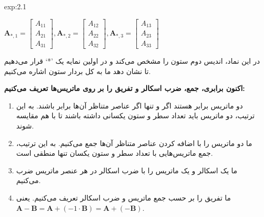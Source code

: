 {\begin{spacing}{1.5}
\begin{example}{exp:2.1}
            \begin{center}
                $\textbf{A}_{*,1}=\begin{bmatrix}
                                      A_{11} \\
                                      A_{21} \\
                                      A_{31}
                \end{bmatrix},
                \textbf{A}_{*,2}=\begin{bmatrix}
                                     A_{12} \\
                                     A_{22} \\
                                     A_{32}
                \end{bmatrix},
                \textbf{A}_{*,3}=\begin{bmatrix}
                                     A_{13} \\
                                     A_{23} \\
                                     A_{33}
                \end{bmatrix}$
            \end{center}

            در این نماد، اندیس دوم ستون را مشخص می‌کند و در اولین نمایه یک ’*‘ قرار می‌دهیم تا نشان دهد ما به کل بردار ستون اشاره می‌کنیم.

            \textbf{اکنون برابری، جمع، ضرب اسکالر و تفریق را بر روی ماتریس‌ها تعریف می‌کنیم:}

            \begin{enumerate}[label=\textbf{\arabic*}.]
                \item {دو ماتریس برابر هستند اگر و تنها اگر عناصر متناظر آن‌ها برابر باشند.
                به این ترتیب، دو ماتریس باید تعداد سطر و ستون یکسانی داشته باشند تا با هم مقایسه شوند.}
                \item {ما دو ماتریس را با اضافه کردن عناصر متناظر آن‌ها جمع می‌کنیم.
                به این ترتیب، جمع ماتریس‌هایی با تعداد سطر و ستون یکسان تنها منطقی است.}
                \item {ما یک اسکالر و یک ماتریس را با ضرب اسکالر در هر عنصر ماتریس ضرب می‌کنیم.}
                \item {ما تفریق را بر حسب جمع ماتریس و ضرب اسکالر تعریف می‌کنیم. یعنی \\ $\textbf{A}-\textbf{B}=\textbf{A}+(-1\cdot\textbf{B})=\textbf{A}+(-\textbf{B})$.}
            \end{enumerate}
        \end{example}


\end{spacing}}
